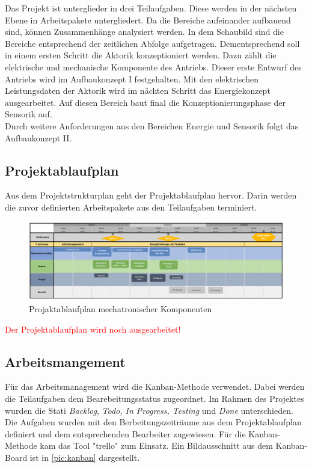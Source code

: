 Das Projekt ist unterglieder in drei Teilaufgaben. Diese werden in der nächsten Ebene in Arbeitspakete untergliedert. 
Da die Bereiche aufeinander aufbauend sind, können Zusammenhänge analysiert werden. In dem Schaubild sind die Bereiche entsprechend der zeitlichen Abfolge aufgetragen. Dementsprechend soll in einem ersten Schritt die Aktorik konzeptioniert werden. Dazu zählt die elektrische und mechanische Komponente des Antriebs. Dieser erste Entwurf des Antriebs wird im Aufbaukonzept I festgehalten. Mit den elektrischen Leistungsdaten der Aktorik wird im nächten Schritt das Energiekonzept ausgearbeitet. Auf diesen Bereich baut final die Konzeptionierungsphase der Sensorik auf. \\ 
Durch weitere Anforderungen aus den Bereichen Energie und Sensorik folgt das Aufbaukonzept II. 

\newpage
\subsection{Projektablaufplan}
\label{projektablaufplan}
Aus dem Projektstrukturplan geht der Projektablaufplan hervor. Darin werden die zuvor definierten Arbeitspakete aus den Teilaufgaben terminiert. 
\begin{figure}[h]
	\begin{center}
		\includegraphics[width=17cm]{roadmap.png}
		\caption{Projaktablaufplan mechatronischer Komponenten}
		\label{pic:roadmap}
	\end{center}
\end{figure}

\textcolor{red}{Der Projektablaufplan wird noch ausgearbeitet!}

\newpage
\subsection{Arbeitsmangement}
\label{sec:arbeitsmanagement}
Für das Arbeitsmanagement wird die Kanban-Methode verwendet. Dabei werden die Teilaufgaben dem Bearebeitungsstatus zugeordnet. Im Rahmen des Projektes wurden die Stati \textit{Backlog}, \textit{Todo,  In Progress, Testing} und \textit{Done}  unterschieden. Die Aufgaben wurden mit den Berbeitungszeiträume aus dem Projektablaufplan definiert und dem entsprechenden Bearbeiter zugewiesen. 	
Für die Kanban-Methode kam das Tool "trello" zum Einsatz. Ein Bildausschnitt aus dem Kanban-Board ist in \autoref{pic:kanban} dargestellt. 


